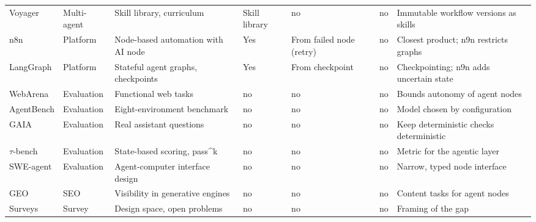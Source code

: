 \documentclass[conference]{IEEEtran}
\begin{document}
\begin{table}[!t]
\begin{tabular}{L{2.3cm} L{1.5cm} L{3.4cm} L{1.4cm} L{1.3cm} L{1.7cm} L{3.3cm}}
Voyager \cite{wang2023voyager} & Multi-agent & Skill library, curriculum & Skill library & no & no & Immutable workflow versions as skills \\
n8n \cite{n8n} & Platform & Node-based automation with AI node & Yes & From failed node (retry) & no & Closest product; n9n restricts graphs \\
LangGraph \cite{langgraph} & Platform & Stateful agent graphs, checkpoints & Yes & From checkpoint & no & Checkpointing; n9n adds uncertain state \\
WebArena \cite{zhou2024webarena} & Evaluation & Functional web tasks & no & no & no & Bounds autonomy of agent nodes \\
AgentBench \cite{liu2024agentbench} & Evaluation & Eight-environment benchmark & no & no & no & Model chosen by configuration \\
GAIA \cite{mialon2023gaia} & Evaluation & Real assistant questions & no & no & no & Keep deterministic checks deterministic \\
$\tau$-bench \cite{yao2024taubench} & Evaluation & State-based scoring, pass\^{}k & no & no & no & Metric for the agentic layer \\
SWE-agent \cite{yang2024sweagent} & Evaluation & Agent-computer interface design & no & no & no & Narrow, typed node interface \\
GEO \cite{aggarwal2024geo} & SEO & Visibility in generative engines & no & no & no & Content tasks for agent nodes \\
Surveys \cite{wang2024survey,xi2023rise,masterman2024landscape} & Survey & Design space, open problems & no & no & no & Framing of the gap \\
\bottomrule
\end{tabular}
\end{table}
\end{document}
